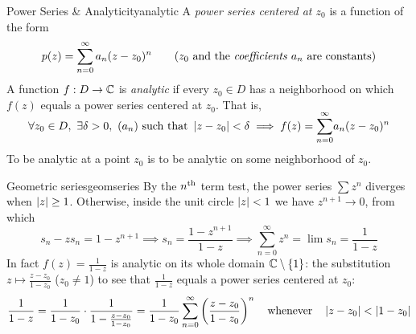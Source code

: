 \goodbreak
% 
%   
%   
%   
 

\begin{defn}{Power Series \& Analyticity}{analytic}
	A \emph{power series centered at $z_0$} is a function of the form
	\[
		p(z)=\sum_{n=0}^\infty a_n(z-z_0)^n \tag{$z_0$ and the \emph{coefficients} $a_n$ are constants}
	\]
	A function $f:D\to\mathbb{C}$ is \emph{analytic} if every $z_0\in D$ has a neighborhood on which $f(z)$ equals a power series centered at $z_0$. That is,
	\[
		\forall z_0\in D,\ \exists\delta>0,\ (a_n)\text{ such that }\nm{z-z_0}<\delta\implies f(z)=\smash[t]{\sum_{n=0}^\infty} a_n(z-z_0)^n
	\]
	To be analytic at a point $z_0$ is to be analytic on some neighborhood of $z_0$.
\end{defn}


\begin{example}{Geometric series}{geomseries}
	By the $n\textsuperscript{th}$ term test, the power series $\sum\limits z^n$ diverges when $\left| z\right|\ge 1$. Otherwise, inside the unit circle $\left| z\right|<1$ we have $z^{n+1}\to 0$, from which
	\[
		s_n-zs_n=1-z^{n+1}\implies s_n=\frac{1-z^{n+1}}{1-z} \implies \sum\limits_{n=0}^\infty z^n =\lim s_n=\frac 1{1-z}
	\]
	In fact $f(z)=\frac 1{1-z}$ is analytic on its whole domain $\mathbb{C}\setminus\{1\}$: the substitution $z\mapsto\frac{z-z_0}{1-z_0}$ ($z_0\neq 1$) to see that $\frac 1{1-z}$ equals a power series centered at $z_0$:
	\[
		\frac 1{1-z} =\frac 1{1-z_0}\cdot \frac 1{1-\frac{z-z_0}{1-z_0}}=\frac 1{1-z_0}\sum_{n=0}^\infty \left(\frac{z-z_0}{1-z_0}\right)^n
		\quad\text{whenever}\quad
		\left| z-z_0\right|<\left| 1-z_0\right|
	\]
\end{example}

